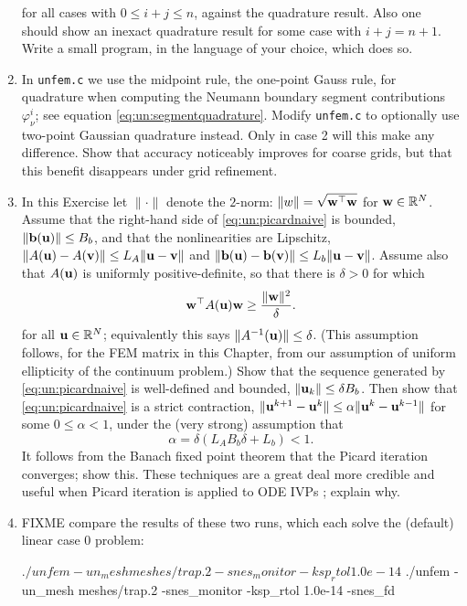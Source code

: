 \begin{enumerate}
\begin{equation}
\end{equation}
for all cases with $0\le i+j\le n$, against the quadrature result.  Also one should show an inexact quadrature result for some case with $i+j=n+1$.  Write a small program, in the language of your choice, which does so.
\item \label{exer:un:gaussneumann}  In \texttt{unfem.c} we use the midpoint rule, the one-point Gauss rule, for quadrature when computing the Neumann boundary segment contributions $\varphi_\nu^i$; see equation \eqref{eq:un:segmentquadrature}.  Modify \texttt{unfem.c} to optionally use two-point Gaussian quadrature instead.  Only in case 2 will this make any difference.  Show that accuracy noticeably improves for coarse grids, but that this benefit disappears under grid refinement.
\item \label{exer:un:picardconvergence}  In this Exercise let $\|\cdot\|$ denote the $2$-norm: $\|w\| = \sqrt{\mathbf{w}^\top \mathbf{w}}$ for $\mathbf{w}\in\mathbb{R}^N$.  Assume that the right-hand side of \eqref{eq:un:picardnaive} is bounded, $\|\mathbf{b}(\mathbf{u})\| \le B_b$, and that the nonlinearities are Lipschitz, $\|A(\mathbf{u})-A(\mathbf{v})\| \le L_A \|\mathbf{u}-\mathbf{v}\|$ and $\|\mathbf{b}(\mathbf{u})-\mathbf{b}(\mathbf{v})\| \le L_b \|\mathbf{u}-\mathbf{v}\|$.  Assume also that $A(\mathbf{u})$ is uniformly positive-definite, so that there is $\delta>0$ for which
    $$\mathbf{w}^\top A(\mathbf{u}) \mathbf{w} \ge \frac{\|\mathbf{w}\|^2}{\delta}.$$
for all $\mathbf{u}\in \mathbb{R}^N$; equivalently this says $\|A^{-1}(\mathbf{u})\| \le \delta$.  (This assumption follows, for the FEM matrix in this Chapter, from our assumption of uniform ellipticity of the continuum problem.)  Show that the sequence generated by \eqref{eq:un:picardnaive} is well-defined and bounded, $\|\mathbf{u}_k\| \le \delta B_b$.  Then show that \eqref{eq:un:picardnaive} is a strict contraction, $\|\mathbf{u}^{k+1}-\mathbf{u}^{k}\| \le \alpha \|\mathbf{u}^{k}-\mathbf{u}^{k-1}\|$ for some $0\le \alpha < 1$, under the (very strong) assumption that
    $$\alpha = \delta \left(L_A B_b \delta + L_b\right) < 1.$$
It follows from the Banach fixed point theorem that the Picard iteration converges; show this.  These techniques are a great deal more credible and useful when Picard iteration is applied to ODE IVPs \citep{HirschSmaleDevaney2004}; explain why.
\item FIXME compare the results of these two runs, which each solve the (default) linear case 0 problem:
\begin{cline}
$ ./unfem -un_mesh meshes/trap.2 -snes_monitor -ksp_rtol 1.0e-14
$ ./unfem -un_mesh meshes/trap.2 -snes_monitor -ksp_rtol 1.0e-14 -snes_fd
\end{cline}

\end{enumerate}

